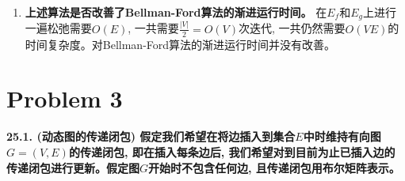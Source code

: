 \documentclass[paper=a4, fontsize=11pt]{scrartcl} %
\numberwithin{equation}{section} %
\numberwithin{figure}{section} %
\numberwithin{table}{section} %
\begin{document}
\begin{enumerate}[a]
\begin{proof}
    \[
    \begin{split}
      \displaystyle\sum_{i=1}^n y_{fi} + y_{bi} = l \leq |V| - 1 \\
      \begin{cases}
        y_{bi} > 0, \quad i=1,2,\dots,n-1\\
        y_{bn} \geq 0\\
        y_{f1} \geq 0\\
        y_{fi} > 0, \quad i=2,3,\dots,n
      \end{cases}
    \end{split}
    \]

    根据上面对$y_{bi}$和$y_{fi}$的分析, 我们有, $\sum_{i=1}^n y_{fi} + y_{bi} \geq 2n - 2$, 代入方程有$2n - 2 \leq l \leq |V| - 1$, 即$n \leq (|V|+1)/2$, 所以最多只需要$\lceil \frac{|V|}{2} \rceil$即可。

  \end{proof}

\item \textbf{上述算法是否改善了Bellman-Ford算法的渐进运行时间。}
  在$E_f$和$E_g$上进行一遍松弛需要$O(E)$, 一共需要$\frac{|V|}{2} = O(V)$次迭代, 一共仍然需要$O(VE)$的时间复杂度。对Bellman-Ford算法的渐进运行时间并没有改善。

\end{enumerate}

\section{Problem 3}
\textbf{25.1. (动态图的传递闭包) 假定我们希望在将边插入到集合$E$中时维持有向图$G = (V, E)$的传递闭包, 即在插入每条边后, 我们希望对到目前为止已插入边的传递闭包进行更新。假定图$G$开始时不包含任何边, 且传递闭包用布尔矩阵表示。}
\end{document}
